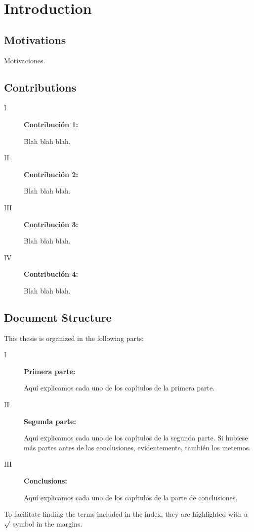 \chapter{Introduction}

\section{Motivations}
Motivaciones.


\section{Contributions}

\begin{description}
\item[I] \begin{flushleft}\textbf{Contribución 1:}\end{flushleft}
Blah blah blah.

\item[II] \begin{flushleft}\textbf{Contribución 2:}\end{flushleft}
Blah blah blah.

\item[III] \begin{flushleft}\textbf{Contribución 3:}\end{flushleft}
Blah blah blah.

\item[IV] \begin{flushleft}\textbf{Contribución 4:}\end{flushleft}
Blah blah blah.


\end{description}



\section{Document Structure}
This thesis is organized in the following parts:
\begin{description}

\item[I] \begin{flushleft}\textbf{Primera parte:}\end{flushleft}
Aquí explicamos cada uno de los capítulos de la primera parte.

\item[II] \begin{flushleft}\textbf{Segunda parte:}\end{flushleft}
Aquí explicamos cada uno de los capítulos de la segunda parte. Si hubiese más partes antes de las conclusiones, evidentemente, también los metemos.

\item[III] \begin{flushleft}\textbf{Conclusions:}\end{flushleft}
Aquí explicamos cada uno de los capítulos de la parte de conclusiones.


\end{description}

To facilitate finding the terms included in the index, they are highlighted with a $\surd$ 
\checkoddpage
\ifthenelse
{}
{\marginnote{\termMarkOdd}}
{\marginnote{\termMarkEven}}
symbol in the margins.


